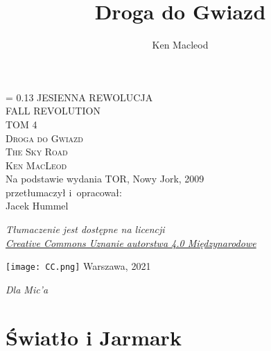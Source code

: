 \documentclass[oneside,polish,11pt,sfheadings]{mwbk}
\begin{document}
\title{Droga do Gwiazd}
\author{Ken Macleod}


\DeclareRobustCommand{\cs}[1]{\texttt{\char`\\#1}}
\newlength{\tpheight}\setlength{\tpheight}{0.9\textheight}
\newlength{\txtheight}\setlength{\txtheight}{0.9\tpheight}
\newlength{\tpwidth}\setlength{\tpwidth}{0.9\textwidth}
\newlength{\txtwidth}\setlength{\txtwidth}{0.9\tpwidth}
\newlength{\drop}
\newcommand*{\titleSI}{\begingroup%
\drop = 0.13\txtheight
\centering
{\Huge \textsf{JESIENNA REWOLUCJA}}\\[1\baselineskip]
{\huge \textsf{FALL REVOLUTION}}\\[1\baselineskip]
{\LARGE  \textsf{TOM 4}}\\[4\baselineskip]
{\Huge \textsc{Droga do Gwiazd}}\\[1\baselineskip]
{\LARGE \textsc{The Sky Road}}\\[2\baselineskip]
{\huge \textsc{Ken MacLeod}}\\[4\baselineskip]
{\large Na podstawie wydania TOR, Nowy Jork, 2009 \\ przetłumaczył i~opracował:}\\
{\Large Jacek Hummel}\\[2\baselineskip]
{\normalsize \textit{Tłumaczenie jest dostępne na licencji\\
\href{https://creativecommons.org/licenses/by/4.0/deed.pl}{Creative Commons Uznanie autorstwa 4.0 Międzynarodowe}} \\ \par}
\texttt{[image: CC.png]}
\vfill
{\Large {Warszawa, 2021}}\\
\endgroup}
\titleSI
\thispagestyle{empty}

\begin{figure}[p]
    \vspace*{-1cm}
\end{figure}
\thispagestyle{empty}


\newpage

\vspace*{2cm}


\textit{Dla Mic'a}

\chapter{Światło i Jarmark}
\end{document}
